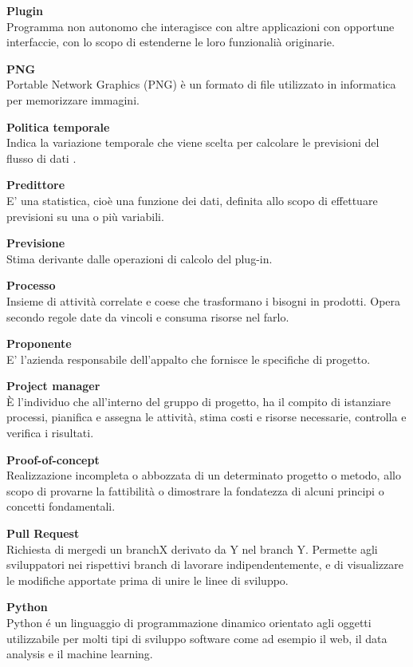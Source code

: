 \documentclass[a4paper, oneside, openany, dvipsnames, table, 12pt]{article}
\begin{document}
\textbf{Plugin} \\
Programma non autonomo che interagisce con altre applicazioni con opportune interfaccie, con lo scopo di estenderne le loro funzionalià originarie.

\textbf{PNG} \\
Portable Network Graphics (PNG) è un formato di file utilizzato in informatica per memorizzare immagini.

\textbf{Politica temporale} \\
Indica la variazione temporale che viene scelta per calcolare le previsioni del flusso di dati .

\textbf{Predittore} \\
E' una statistica, cioè una funzione dei dati, definita allo scopo di effettuare previsioni su una o più variabili.

\textbf{Previsione} \\
Stima derivante dalle operazioni di calcolo del plug-in.

\textbf{Processo} \\
Insieme di attività correlate e coese che trasformano i bisogni in prodotti. Opera secondo regole date da vincoli e consuma risorse nel farlo.

\textbf{Proponente} \\
E' l'azienda responsabile dell'appalto che fornisce le specifiche di progetto.

\textbf{Project manager} \\
È l'individuo che all'interno del gruppo di progetto, ha il compito di istanziare processi, pianifica e assegna le attività, stima costi e risorse necessarie, controlla e verifica i risultati.

\textbf{Proof-of-concept} \\
Realizzazione incompleta o abbozzata di un determinato progetto o metodo, allo scopo di provarne la fattibilità o dimostrare la fondatezza di alcuni principi o concetti fondamentali.

\textbf{Pull Request} \\
Richiesta di merge\glo di un branch\glo X derivato da Y nel branch Y. Permette agli sviluppatori nei rispettivi branch di lavorare indipendentemente, e di visualizzare le modifiche apportate prima di unire le linee di sviluppo.

\textbf{Python} \\
Python \'e un linguaggio di programmazione dinamico orientato agli oggetti utilizzabile per molti tipi di sviluppo software come ad esempio il web, il data analysis e il machine learning.
\end{document}
